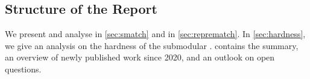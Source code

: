 \subsection{Structure of the Report}
\label{subsec:intro:structure}

We present and analyse \SMatch{} in \cref{sec:smatch} and \RepReMatch{} in \cref{sec:reprematch}.
In \cref{sec:hardness}, we give an analysis on the hardness of the submodular \NSW.
 contains the summary, an overview of newly published work since 2020, and an outlook on open questions.


